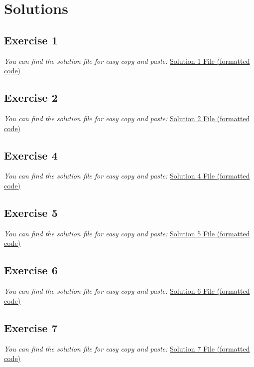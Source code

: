 \section{Solutions}

\subsection{Exercise 1}
\textit{You can find the solution file for easy copy and paste:} \href{https://github.com/elRaulito/eUTxO-Fundamentals-Building-Cardano-Smart-Contracts/blob/main/eBook/sections/solutions/index.html}{Solution 1 File (formatted code)}


\subsection{Exercise 2}
\textit{You can find the solution file for easy copy and paste:} \href{https://github.com/elRaulito/eUTxO-Fundamentals-Building-Cardano-Smart-Contracts/blob/main/eBook/sections/solutions/get_addresses.py}{Solution 2 File (formatted code)}


\subsection{Exercise 4}
\textit{You can find the solution file for easy copy and paste:} \href{https://github.com/elRaulito/eUTxO-Fundamentals-Building-Cardano-Smart-Contracts/blob/main/eBook/sections/solutions/nft.ak}{Solution 4 File (formatted code)}


\subsection{Exercise 5}
\textit{You can find the solution file for easy copy and paste:} \href{https://github.com/elRaulito/eUTxO-Fundamentals-Building-Cardano-Smart-Contracts/blob/main/eBook/sections/solutions/cip69.ak}{Solution 5 File (formatted code)}


\subsection{Exercise 6}
\textit{You can find the solution file for easy copy and paste:} \href{https://github.com/elRaulito/eUTxO-Fundamentals-Building-Cardano-Smart-Contracts/blob/main/eBook/sections/solutions/fraction.ak}{Solution 6 File (formatted code)}


\subsection{Exercise 7}
\textit{You can find the solution file for easy copy and paste:} \href{https://github.com/elRaulito/cnft-delist/blob/main/example.js}{Solution 7 File (formatted code)}

